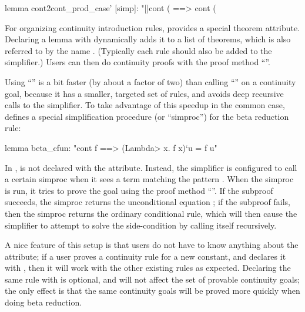 \begin{isacode}
lemma cont2cont_prod_case' [simp]:
  "[|cont (%
    ==> cont (%
\end{isacode}

For organizing continuity introduction rules,  provides a special  theorem attribute. Declaring a lemma with  dynamically adds it to a list of theorems, which is also referred to by the name . (Typically each  rule should also be added to the simplifier.) Users can then do continuity proofs with the proof method ``''.

Using ``'' is a bit faster (by about a factor of two) than calling ``'' on a continuity goal, because it has a smaller, targeted set of rules, and avoids deep recursive calls to the simplifier. To take advantage of this speedup in the common case,  defines a special simplification procedure (or ``simproc'') for the beta reduction rule:

\begin{isacode}
lemma beta_cfun: "cont f ==> (\<Lambda> x. f x)`u = f u"
\end{isacode}

\noindent
In ,  is not declared with the \isa{[simp]} attribute. Instead, the simplifier is configured to call a certain simproc when it sees a term matching the pattern . When the simproc is run, it tries to prove the goal  using the proof method ``''. If the subproof succeeds, the simproc returns the unconditional equation ; if the subproof fails, then the simproc returns the ordinary conditional rule, which will then cause the simplifier to attempt to solve the side-condition  by calling itself recursively.

A nice feature of this setup is that users do not have to know anything about the  attribute; if a user proves a continuity rule for a new constant, and declares it with \isa{[simp]}, then it will work with the other existing  rules as expected. Declaring the same rule with  is optional, and will not affect the set of provable continuity goals; the only effect is that the same continuity goals will be proved more quickly when doing beta reduction.

